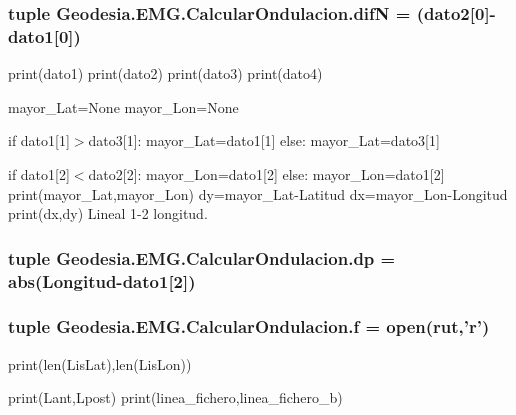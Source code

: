 \subsubsection[{dif\-N}]{\setlength{\rightskip}{0pt plus 5cm}tuple Geodesia.\-E\-M\-G.\-Calcular\-Ondulacion.\-dif\-N = ({\bf dato2}[0]-\/{\bf dato1}[0])}\label{namespaceGeodesia_1_1EMG_1_1CalcularOndulacion_a4ebe2b6fd539d59b4cbda2cc3d24eca2}


print(dato1) print(dato2) print(dato3) print(dato4) 

mayor\-\_\-\-Lat=None mayor\-\_\-\-Lon=None

if dato1[1]$>$dato3[1]\-: mayor\-\_\-\-Lat=dato1[1] else\-: mayor\-\_\-\-Lat=dato3[1]

if dato1[2]$<$dato2[2]\-: mayor\-\_\-\-Lon=dato1[2] else\-: mayor\-\_\-\-Lon=dato1[2] print(mayor\-\_\-\-Lat,mayor\-\_\-\-Lon) dy=mayor\-\_\-\-Lat-\/\-Latitud dx=mayor\-\_\-\-Lon-\/\-Longitud print(dx,dy) Lineal 1-\/2 longitud. 
\subsubsection[{dp}]{\setlength{\rightskip}{0pt plus 5cm}tuple Geodesia.\-E\-M\-G.\-Calcular\-Ondulacion.\-dp = abs(Longitud-\/{\bf dato1}[2])}\label{namespaceGeodesia_1_1EMG_1_1CalcularOndulacion_a0eb87d4d10b3675a5fa2c891c0c03d3e}
\subsubsection[{f}]{\setlength{\rightskip}{0pt plus 5cm}tuple Geodesia.\-E\-M\-G.\-Calcular\-Ondulacion.\-f = open({\bf rut},'r')}\label{namespaceGeodesia_1_1EMG_1_1CalcularOndulacion_aa3ac86d87cdf5b858e2fa4b80d20fdd7}


print(len(\-Lis\-Lat),len(\-Lis\-Lon)) 

print(\-Lant,\-Lpost) print(linea\-\_\-fichero,linea\-\_\-fichero\-\_\-b) 
